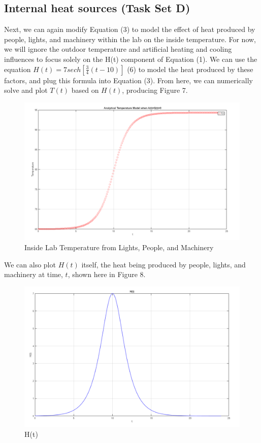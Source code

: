 \documentclass[12pt]{article}
\begin{document}
\subsection{Internal heat sources (Task Set D)}
Next, we can again modify Equation (3) to model the effect of heat produced by people, lights, and machinery within the lab on the inside temperature. For now, we will ignore the outdoor temperature and artificial heating and cooling influences to focus solely on the H(t) component of Equation (1). We can use the equation $H(t)=7sech[\frac{3}{4}(t-10)]$ (6) to model the heat produced by these factors, and plug this formula into Equation (3). From here, we can numerically solve and plot $T(t)$ based on $H(t)$, producing Figure 7.
\begin{figure}[H]
    \centering
    \includegraphics[width=0.75\linewidth]{images/Task_D1.png}
    \caption{Inside Lab Temperature from Lights, People, and Machinery}
    \label{fig:placeholder}
\end{figure}

We can also plot $H(t)$ itself, the heat being produced by people, lights, and machinery at time, $t$, shown here in Figure 8.
\begin{figure}[H]
    \centering
    \includegraphics[width=0.75\linewidth]{images/Task_D2.png}
    \caption{H(t)}
    \label{fig:placeholder}
\end{figure}
\end{document}
